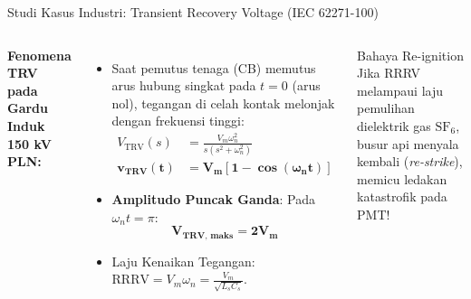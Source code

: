 \documentclass[aspectratio=169,10pt]{beamer}
\begin{document}
\begin{frame}{Studi Kasus Industri: Transient Recovery Voltage (IEC 62271-100)}
  \begin{columns}[c]
    \textbf{Fenomena TRV pada Gardu Induk 150 kV PLN:}
    \begin{itemize}
      \item Saat pemutus tenaga (CB) memutus arus hubung singkat pada $t=0$ (arus nol), tegangan di celah kontak melonjak dengan frekuensi tinggi:
      \begin{align*}
        V_{\text{TRV}}(s) &= \frac{V_m \omega_n^2}{s (s^2 + \omega_n^2)} \\
        \mathbf{v_{\text{TRV}}(t)} &= \mathbf{V_m [1 - \cos(\omega_n t)]}
      \end{align*}
      \item \textbf{Amplitudo Puncak Ganda}: Pada $\omega_n t = \pi$:
      \begin{equation*}
        \mathbf{V_{\text{TRV, maks}} = 2 V_m}
      \end{equation*}
      \item Laju Kenaikan Tegangan: $\text{RRRV} = V_m \omega_n = \frac{V_m}{\sqrt{L_s C_s}}$.
    \end{itemize}

    \begin{alertblock}{Bahaya Re-ignition}
      Jika RRRV melampaui laju pemulihan dielektrik gas $\text{SF}_6$, busur api menyala kembali (\textit{re-strike}), memicu ledakan katastrofik pada PMT!
    \end{alertblock}
  \end{columns}
\end{frame}
\end{document}
